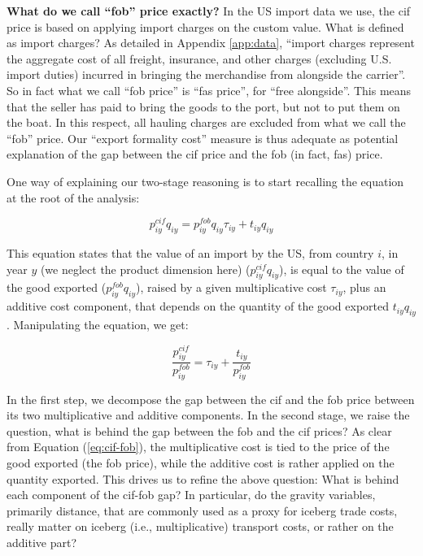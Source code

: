\documentclass[a4paper,11pt]{article}
\begin{document}
\textbf{What do we call ``fob'' price exactly?} In the US import data we use, the cif price is based on applying import charges on the custom value. What is defined as import charges? As detailed in Appendix \ref{app:data}, ``import charges represent the aggregate cost of all freight, insurance, and other charges (excluding U.S. import duties) incurred in bringing the merchandise from alongside the carrier''. So in fact what we call ``fob price'' is ``fas price'', for ``free alongside''. This means that the seller has paid to bring the goods to the port, but not to put them on the boat. In this respect, all hauling charges are excluded from what we call the ``fob'' price. Our ``export formality cost'' measure is thus adequate as potential explanation of the gap between the cif price and the fob (in fact, fas) price.\bigskip


One way of explaining our two-stage reasoning is to start recalling the equation at the root of the analysis:

\begin{equation}
p^{cif}_{iy} q_{iy} = p^{fob}_{iy} q_{iy} \tau_{iy} + t_{iy} q_{iy} \label{eq:cif-fob}
\end{equation}

This equation states that the value of an import by the US, from country $i$, in year $y$ (we neglect the product dimension here) ($p^{cif}_{iy} q_{iy}$), is equal to the value of the good exported ($p^{fob}_{iy} q_{iy}$), raised by a given multiplicative cost $\tau_{iy}$, plus an additive cost component, that depends on the quantity of the good exported $ t_{iy} q_{iy}$. Manipulating the equation, we get:

\begin{equation}
\frac{p^{cif}_{iy}}{p^{fob}_{iy}} = \tau_{iy} +\frac{t_{iy}}{p^{fob}_{iy}}
\label{eq:cif-fob2}
\end{equation}

In the first step, we decompose the gap between the cif and the fob price between its two multiplicative and additive components. In the second stage, we raise the question, what is behind the gap between the fob and the cif prices? As clear from Equation (\ref{eq:cif-fob}), the multiplicative cost is tied to the price of the good exported (the fob price), while the additive cost is rather applied on the quantity exported. This drives us to refine the above question: What is behind each component of the cif-fob gap? In particular, do the gravity variables, primarily distance, that are commonly used as a proxy for iceberg trade costs, really matter on iceberg (i.e., multiplicative) transport costs, or rather on the additive part? \medskip
\end{document}
